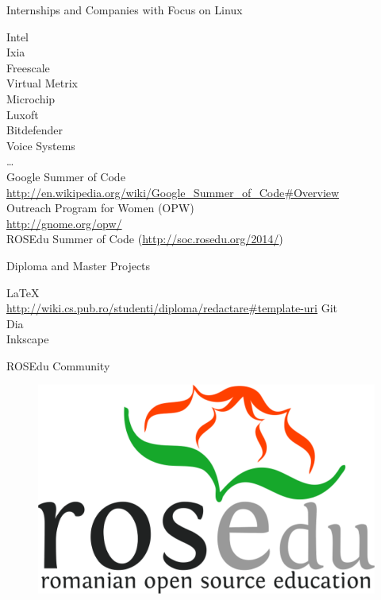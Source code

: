 \documentclass{simple}
\begin{document}
\begin{frame}{Internships and Companies with Focus on Linux}
  \begin{center}
    {\small
      \pause Intel \\
      \pause Ixia \\
      \pause Freescale \\
      \pause Virtual Metrix \\
      \pause Microchip \\
      \pause Luxoft \\
      \pause Bitdefender \\
      \pause Voice Systems \\
      \pause \ldots \\
      \vspace{0.3cm}
      \pause Google Summer of Code \\
      \url{http://en.wikipedia.org/wiki/Google\_Summer\_of\_Code\#Overview} \\
      \vspace{0.3cm}
      \pause Outreach Program for Women (OPW) \\
      \url{http://gnome.org/opw/} \\
      \vspace{0.3cm}
      \pause ROSEdu Summer of Code (\url{http://soc.rosedu.org/2014/})
    }
  \end{center}
\end{frame}

\begin{frame}{Diploma and Master Projects}
  \begin{center}
    {\small
      \pause \LaTeX \\
      \url{http://wiki.cs.pub.ro/studenti/diploma/redactare\#template-uri}
      \vspace{0.3cm}
      \pause Git \\
      \vspace{0.3cm}
      \pause Dia \\
      \vspace{0.3cm}
      \pause Inkscape
    }
  \end{center}
\end{frame}

\begin{frame}{ROSEdu Community}
  \begin{figure}
    \centering
      \includegraphics[width=0.6\linewidth]{img/rosedu-logo} \\
  \end{figure}
\end{frame}
\end{document}
